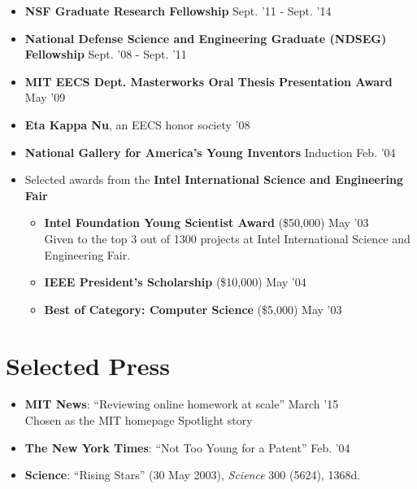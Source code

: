 \documentclass[margin]{res}
\begin{document}
\begin{resume}
\begin{itemize}[leftmargin=*]
\item {\bf NSF Graduate Research Fellowship} \hfill Sept. '11 - Sept. '14

\item {\bf National Defense Science and Engineering Graduate (NDSEG) \\ Fellowship} \hfill Sept. '08 - Sept. '11
          
\item {\bf MIT EECS Dept. Masterworks Oral Thesis Presentation Award} \hfill May '09   

\item {\bf Eta Kappa Nu}, an EECS honor society \hfill '08

\item {\bf National Gallery for America's Young Inventors} Induction \hfill Feb. '04

\item Selected awards from the {\bf Intel International Science and Engineering Fair}
\begin{itemize}[leftmargin=*] \itemsep -2pt



\item {\bf Intel Foundation Young Scientist Award} (\$50,000) \hfill May '03 \\Given to the top 3 out of 1300 projects at Intel International Science and Engineering Fair.
\item {\bf IEEE President's Scholarship} (\$10,000) \hfill May '04
\item {\bf Best of Category: Computer Science} (\$5,000) \hfill May '03
\end{itemize}
\end{itemize}

\section{Selected Press}
\begin{itemize}[leftmargin=*] \itemsep -2pt
\item \textbf{MIT News}: ``Reviewing online homework at scale'' \hfill March '15 \\
Chosen as the MIT homepage Spotlight story 
\item \textbf{The New York Times}: ``Not Too Young for a Patent'' \hfill Feb. '04
\item \textbf{Science}: ``Rising Stars'' (30 May 2003), \textit{Science} 300 (5624), 1368d.


\end{itemize}
\end{resume}
\end{document}
